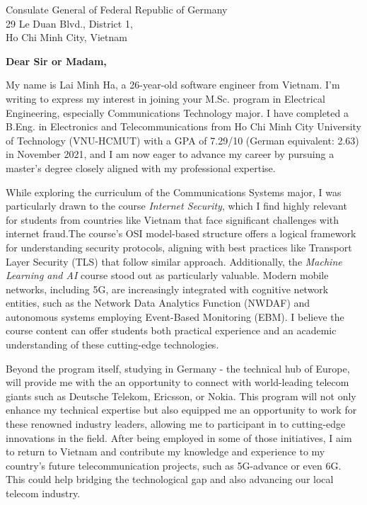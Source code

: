 \documentclass[a4paper,11pt]{letter}
\date{}
\begin{document}
\begin{letter}{
    Consulate General of Federal Republic of Germany
    \\ 29 Le Duan Blvd., District 1,
    \\ Ho Chi Minh City, Vietnam
}



\opening{\textbf{Dear Sir or Madam,}}

My name is Lai Minh Ha, a 26-year-old software engineer from Vietnam. I'm writing to express my interest in joining your M.Sc. program in Electrical Engineering, especially Communications Technology major. I have completed a B.Eng. in Electronics and Telecommunications from Ho Chi Minh City University of Technology (VNU-HCMUT) with a GPA of 7.29/10 (German equivalent: 2.63) in November 2021, and I am now eager to advance my career by pursuing a master’s degree closely aligned with my professional expertise. 

While exploring the curriculum of the Communications Systems major, I was particularly drawn to the course \textit{Internet Security}, which I find highly relevant for students from countries like Vietnam that face significant challenges with internet fraud.The course’s OSI model-based structure offers a logical framework for understanding security protocols, aligning with best practices like Transport Layer Security (TLS) that follow similar approach. Additionally, the \textit{Machine Learning and AI} course stood out as particularly valuable. Modern mobile networks, including 5G, are increasingly integrated with cognitive network entities, such as the Network Data Analytics Function (NWDAF) and autonomous systems employing Event-Based Monitoring (EBM). I believe the course content can offer students both practical experience and an academic understanding of these cutting-edge technologies.

Beyond the program itself, studying in Germany - the technical hub of Europe, will provide me with the an opportunity to connect with world-leading telecom giants such as Deutsche Telekom, Ericsson, or Nokia. This program will not only enhance my technical expertise but also equipped me an opportunity to work for these renowned industry leaders, allowing me to participant in to cutting-edge innovations in the field. After being employed in some of those initiatives, I aim to return to Vietnam and contribute my knowledge and experience to my country's future telecommunication projects, such as 5G-advance or even 6G. This could help bridging the technological gap and also advancing our local telecom industry. 


\end{letter}
\end{document}
